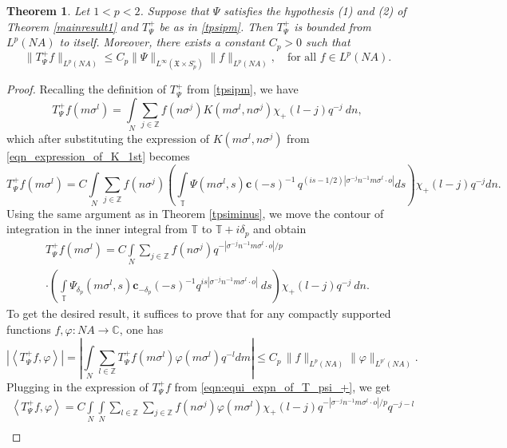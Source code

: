 \documentclass[12pt,reqno]{amsart}
\newcommand{\C}{\mathbb C}
\newcommand{\T}{\mathbb{T}}
\newtheorem{theorem}{Theorem}[section]
\theoremstyle{definition}
\theoremstyle{definition}
\numberwithin{equation}{section}
\begin{document}
\begin{theorem}\label{thm:tpsi_plus_bdd}
	Let $ 1<p<2$. Suppose that $ \Psi $ satisfies the hypothesis (1) and (2) of Theorem \ref{mainresult1} and  $T_{\Psi}^{+}$ be as in \eqref{tpsipm}. Then $T_{\Psi}^{+}$   is bounded from $L^{p}(NA)$ to itself. Moreover, there exists a constant $ C_{p}>0 $  such that  
	$$\|T_{\Psi}^{+}f\|_{L^{p}(NA)} \leq C_{p} \| \Psi\|_{L^\infty(\mathfrak{X}\times S^\circ_p)}   \|f\|_{L^{p}(NA)},\quad\text{for all }f\in L^{p}(NA).$$ 
\end{theorem}
\begin{proof}
	Recalling the definition of $T_{\Psi}^{+}  $ from \eqref{tpsipm}, we have
	$$T^+_{\Psi}f(m\sigma^l) =\int\limits_{N}\sum\limits_{j\in\mathbb{Z}}f(n\sigma^{j})K(m\sigma^{l},n\sigma^{j})\chi_{+}(l-j)q^{-j}~dn,$$
which after substituting the expression of $ K(m\sigma^{l},n\sigma^{j})$ from \eqref{eqn_expression_of_K_1st} becomes 
$$T^+_\Psi f(m\sigma^l) = C  \int\limits_{N}\sum\limits_{j\in\mathbb{Z}}f(n\sigma^{j})  \left(\int\limits_{\mathbb{T}}\Psi(m\sigma^l,s) \mathbf{c}(-s)^{-1}\,q^{(is-1/2)|\sigma^{-j}n^{-1}m\sigma^{l}\cdot o|}ds\right)\chi_{+}(l-j)q^{-j} dn.$$
Using the same argument as in  Theorem \ref{tpsiminus}, we move the contour of integration in the inner integral from $ \T $  to $ \T+i\delta_{p} $  and obtain
\begin{multline}\label{eqn:equi_expn_of_T_psi_+}
T_{\Psi}^{+}f(m\sigma^{l})=C\int\limits_{N}\sum\limits_{j\in\mathbb{Z}}f(n\sigma^{j})q^{-|\sigma^{-j}n^{-1}m\sigma^{l}\cdot o|/p}\\
\cdot \left(\int\limits_{\mathbb{T}}\Psi_{\delta_{p}}(m\sigma^{l},s) \mathbf{c}_{-\delta_{p}}(-s)^{-1} q^{is|\sigma^{-j}n^{-1}m\sigma^{l}\cdot o|}~ds\right)\chi_{+}(l-j)q^{-j}~dn.
\end{multline}
To get the desired result, it suffices to prove that for any compactly supported functions $ f,\varphi : N A\rightarrow \C$, one has
$$\left| \left\langle T_{\Psi}^{+}f, \varphi\right\rangle\right|=  \left| \int\limits_{N}\sum\limits_{l\in\mathbb{Z} }   T_{\Psi}^{+}f(m\sigma^{l}) \varphi(m\sigma^l) q^{-l} dm\right|\leq C_p\, \|f\|_{L^p(NA)}  \|\varphi\|_{L^{p'}(NA)}.$$
Plugging in the expression of $T_{\Psi}^{+}f  $ from \eqref{eqn:equi_expn_of_T_psi_+}, we get
\begin{multline*}
\left\langle T_{\Psi}^{+}f, \varphi\right\rangle= C\int\limits_{N}  \int\limits_{N} \sum\limits_{l\in\mathbb{Z} } \sum\limits_{j\in\mathbb{Z} }   f(n\sigma^{j})  \varphi(m\sigma^l)\chi_{+}(l-j) q^{-|\sigma^{-j}n^{-1}m\sigma^{l}\cdot o|/p} q^{-j-l}\\

\end{multline*}
\end{proof}
\end{document}
